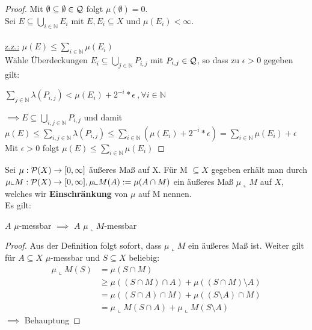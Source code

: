\documentclass[11pt,a4paper,fleqn,openany]{report}
\begin{document}
    \begin{proof}
      Mit $\emptyset \subseteq \emptyset \in \mathcal{Q}$ folgt $\mu(\emptyset) = 0$.\\
      Sei $E \subseteq \bigcup\limits_{i \in \mathbb{N}} E_i$ mit $E, E_i \subseteq X$ und $\mu(E_i) < \infty$.\\ \\
      \underline{z.z.:} $\mu(E) \leq \sum\limits_{i \in \mathbb{N}} \mu(E_i)$\\
      Wähle Überdeckungen $E_i \subseteq \bigcup\limits_{j \in \mathbb{N}} P_{i,j}$ mit $P_{i,j} \in \mathcal{Q}$, so dass zu $\epsilon > 0$ gegeben gilt:
      \begin{center}
        $\sum\limits_{j \in \mathbb{N}} \lambda(P_{i,j}) < \mu(E_i) + 2^{-i} * \epsilon \ , \forall i \in \mathbb{N}$
      \end{center}
      $\implies E \subseteq \bigcup\limits_{i,j \in \mathbb{N}} P_{i,j}$ und damit $\mu(E) \leq \sum\limits_{i,j \in \mathbb{N}} \lambda(P_{i,j}) \leq \sum\limits_{i \in \mathbb{N}} (\mu(E_i) + 2^{-i} * \epsilon) = \sum\limits_{i \in \mathbb{N}} \mu(E_i) + \epsilon$\\
      Mit $\epsilon > 0$ folgt $\mu(E) \leq \sum\limits_{i \in \mathbb{N}} \mu(E_i)$
    \end{proof}

    \begin{theorem}
      Sei $\mu: \mathcal{P}(X) \to [0, \infty]$ äußeres Maß auf X. Für M $\subseteq X$ gegeben erhält man durch $\mu \llcorner M: \mathcal{P}(X) \to [0, \infty], \mu \llcorner M(A) := \mu(A \cap M)$ ein äußeres Maß $\mu \llcorner M$ auf $X$, welches wir \textbf{Einschränkung} von $\mu$ auf M nennen.\\
      Es gilt:
      \begin{center}
        $A$ $\mu$-messbar $\implies$ $A$ $\mu \llcorner M$-messbar
      \end{center} 
    \end{theorem}

    \begin{proof}
      Aus der Definition folgt sofort, dass $\mu \llcorner M$ ein äußeres Maß ist. Weiter gilt für $A \subseteq X$ $\mu$-messbar und $S \subseteq X$ beliebig:
      \begin{align*}
        \mu \llcorner M(S) &= \mu (S \cap M)\\
          &\geq \mu((S \cap M) \cap A) + \mu((S \cap M) \setminus A)\\
          &= \mu ((S \cap A) \cap M) + \mu ((S \setminus A) \cap M)\\
          &= \mu \llcorner M (S \cap A) + \mu \llcorner M (S \setminus A)
      \end{align*}
      $\implies$ Behauptung
    \end{proof}
\end{document}
